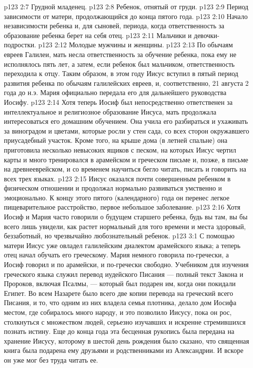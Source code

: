 \vs p123 2:7 \bibnobreakspace Грудной младенец.
\vs p123 2:8 \bibnobreakspace Ребенок, отнятый от груди.
\vs p123 2:9 \bibnobreakspace Период зависимости от матери, продолжающийся до конца пятого года.
\vs p123 2:10 \bibnobreakspace Начало независимости ребенка и, для сыновей, периода, когда ответственность за образование ребенка берет на себя отец.
\vs p123 2:11 \bibnobreakspace Мальчики и девочки\hyp{}подростки.
\vs p123 2:12 \bibnobreakspace Молодые мужчины и женщины.
\vs p123 2:13 \pc По обычаям евреев Галилеи, мать несла ответственность за обучение ребенка, пока ему не исполнялось пять лет, а затем, если ребенок был мальчиком, ответственность переходила к отцу. Таким образом, в этом году Иисус вступил в пятый период развития ребенка по обычаям галилейских евреев, и, соответственно, 21 августа 2 года до н.э. Мария официально передала его для дальнейшего руководства Иосифу.
\vs p123 2:14 Хотя теперь Иосиф был непосредственно ответственен за интеллектуальное и религиозное образование Иисуса, мать продолжала интересоваться его домашним обучением. Она учила его разбираться и ухаживать за виноградом и цветами, которые росли у стен сада, со всех сторон окружавшего приусадебный участок. Кроме того, на крыше дома (в летней спальне) она приготовила несколько невысоких ящиков с песком, на которых Иисус чертил карты и много тренировался в арамейском и греческом письме и, позже, в письме на древнееврейском, и со временем научиться бегло читать, писать и говорить на всех трех языках.
\vs p123 2:15 Иисус оказался почти совершенным ребенком в физическом отношении и продолжал нормально развиваться умственно и эмоционально. К концу этого пятого (календарного) года он перенес легкое пищеварительное расстройство, первое небольшое заболевание.
\vs p123 2:16 Хотя Иосиф и Мария часто говорили о будущем старшего ребенка, будь вы там, вы бы всего лишь увидели, как растет нормальный для того времени и места здоровый, беззаботный, но чрезвычайно любознательный ребенок.
\vs p123 3:1 С помощью матери Иисус уже овладел галилейским диалектом арамейского языка; а теперь отец начал обучать его греческому. Мария немного говорила по\hyp{}гречески, а Иосиф говорил и по арамейски, и по\hyp{}гречески свободно. Учебником для изучения греческого языка служил перевод иудейского Писания --- полный текст Закона и Пророков, включая Псалмы, --- который был подарен им, когда они покидали Египет. Во всем Назарете было всего две копии перевода на греческий всего Писания, и то, что одним из них владела семья плотника, делало дом Иосифа местом, где собиралось много народу, и это позволило Иисусу, пока он рос, столкнуться с множеством людей, серьезно изучавших и искренне стремившихся познать истину. Еще до конца года эта бесценная рукопись была передана на хранение Иисусу, которому в шестой день рождения было сказано, что священная книга была подарена ему друзьями и родственниками из Александрии. И вскоре он уже мог без труда читать ее.
